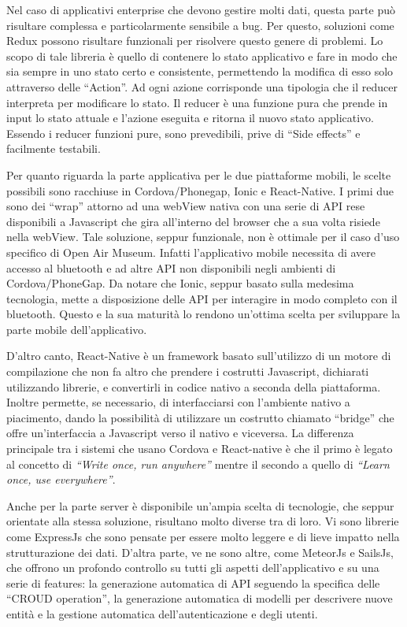 Nel caso di applicativi enterprise che devono gestire molti dati, questa parte può risultare complessa e particolarmente sensibile a bug. Per questo, soluzioni come Redux possono risultare funzionali per risolvere questo genere di problemi. Lo scopo di tale libreria è quello di contenere lo stato applicativo e fare in modo che sia sempre in uno stato certo e consistente, permettendo la modifica di esso solo attraverso delle “Action”. Ad ogni azione corrisponde una tipologia che il reducer interpreta per modificare lo stato. Il reducer è una funzione pura che prende in input lo stato attuale e l’azione eseguita e ritorna il nuovo stato applicativo. Essendo i reducer funzioni pure, sono prevedibili, prive di “Side effects” e facilmente testabili.\vspace{5mm} 

Per quanto riguarda la parte applicativa per le due piattaforme mobili, le scelte possibili sono racchiuse in Cordova/Phonegap\cite{phonegap}, Ionic\cite{ionic} e React-Native\cite{ReactNative}. I primi due sono dei “wrap” attorno ad una webView nativa con una serie di API rese disponibili a Javascript che gira all’interno del browser che a sua volta risiede nella webView. Tale soluzione, seppur funzionale, non è ottimale per il caso d’uso specifico di Open Air Museum. Infatti l’applicativo mobile necessita di avere accesso al bluetooth e ad altre API non disponibili negli ambienti di Cordova/PhoneGap. Da notare che Ionic, seppur basato sulla medesima tecnologia, mette a disposizione delle API per interagire in modo completo con il bluetooth. Questo e la sua maturità lo rendono un'ottima scelta per sviluppare la parte mobile dell’applicativo.\vspace{5mm} 

D’altro canto, React-Native è un framework basato sull’utilizzo di un motore di compilazione che non fa altro che prendere i costrutti Javascript, dichiarati utilizzando librerie, e convertirli in codice nativo a seconda della piattaforma. Inoltre permette, se necessario, di interfacciarsi con l’ambiente nativo a piacimento, dando la possibilità di utilizzare un costrutto chiamato “bridge” che offre un’interfaccia a Javascript verso il nativo e viceversa. La differenza principale tra i sistemi che usano Cordova e React-native è che il primo è legato al concetto di \emph{“Write once, run anywhere”} mentre il secondo a quello di \emph{“Learn once, use everywhere”}.\vspace{5mm}

Anche per la parte server è disponibile un'ampia scelta di tecnologie, che seppur orientate alla stessa soluzione, risultano molto diverse tra di loro. Vi sono librerie come ExpressJs che sono pensate per essere molto leggere e di lieve impatto nella strutturazione dei dati. D'altra parte, ve ne sono altre, come MeteorJs\cite{metheorjs} e SailsJs\cite{sailsjs}, che offrono un profondo controllo su tutti gli aspetti dell’applicativo e su una serie di features: la generazione automatica di API seguendo la specifica delle “CROUD operation”, la generazione automatica di modelli per descrivere nuove entità e la gestione automatica dell’autenticazione e degli utenti.

